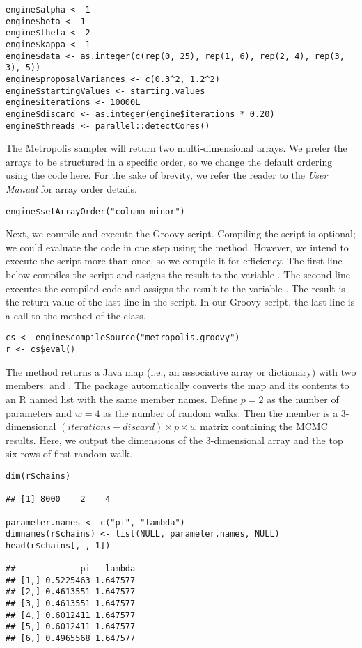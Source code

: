 \begin{verbatim}
engine$alpha <- 1
engine$beta <- 1
engine$theta <- 2
engine$kappa <- 1
engine$data <- as.integer(c(rep(0, 25), rep(1, 6), rep(2, 4), rep(3, 3), 5))
engine$proposalVariances <- c(0.3^2, 1.2^2)
engine$startingValues <- starting.values
engine$iterations <- 10000L
engine$discard <- as.integer(engine$iterations * 0.20)
engine$threads <- parallel::detectCores()
\end{verbatim}

The Metropolis sampler will return two multi-dimensional arrays. We prefer the arrays to be structured in a specific order, so we change the default ordering using the code here. For the sake of brevity, we refer the reader to the \textit{ User Manual} for array order details.

\begin{verbatim}
engine$setArrayOrder("column-minor")
\end{verbatim}

Next, we compile and execute the Groovy script. Compiling the script is optional; we could evaluate the code in one step using the   method. However, we intend to execute the script more than once, so we compile it for efficiency. The first line below compiles the script and assigns the result to the variable . The second line executes the compiled code and assigns the result to the variable . The result is the return value of the last line in the script. In our Groovy script, the last line is a call to the method  of the  class.

\begin{verbatim}
cs <- engine$compileSource("metropolis.groovy")
r <- cs$eval()
\end{verbatim}

The  method returns a Java map (i.e., an associative array or dictionary) with two members:  and . The  package automatically converts the map and its contents to an R named list with the same member names. Define $p = 2$ as the number of parameters and $w = 4$ as the number of random walks. Then the  member is a 3-dimensional $(iterations - discard) \times p \times w$ matrix containing the MCMC results. Here, we output the dimensions of the 3-dimensional array and the top six rows of first random walk.

\begin{verbatim}
dim(r$chains)

## [1] 8000    2    4

parameter.names <- c("pi", "lambda")
dimnames(r$chains) <- list(NULL, parameter.names, NULL)
head(r$chains[, , 1])

##             pi   lambda
## [1,] 0.5225463 1.647577
## [2,] 0.4613551 1.647577
## [3,] 0.4613551 1.647577
## [4,] 0.6012411 1.647577
## [5,] 0.6012411 1.647577
## [6,] 0.4965568 1.647577
\end{verbatim}

